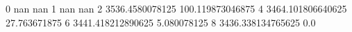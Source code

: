 0 nan nan
1 nan nan
2 3536.4580078125 100.119873046875
4 3464.101806640625 27.763671875
6 3441.418212890625 5.080078125
8 3436.338134765625 0.0
